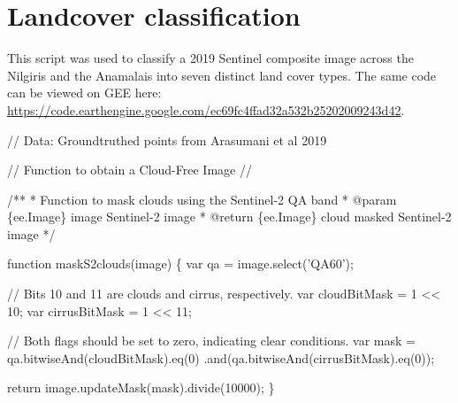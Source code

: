 \documentclass[]{article}
\newenvironment{Shaded}{}{}
\newcommand{\AnnotationTok}[1]{\textcolor[rgb]{0.00,0.50,0.00}{#1}}
\newcommand{\AttributeTok}[1]{#1}
\newcommand{\CommentTok}[1]{\textcolor[rgb]{0.00,0.50,0.00}{#1}}
\newcommand{\CommentVarTok}[1]{\textcolor[rgb]{0.00,0.50,0.00}{#1}}
\newcommand{\ControlFlowTok}[1]{\textcolor[rgb]{0.00,0.00,1.00}{#1}}
\newcommand{\DecValTok}[1]{#1}
\newcommand{\KeywordTok}[1]{\textcolor[rgb]{0.00,0.00,1.00}{#1}}
\newcommand{\NormalTok}[1]{#1}
\newcommand{\OperatorTok}[1]{#1}
\newcommand{\StringTok}[1]{\textcolor[rgb]{0.00,0.50,0.50}{#1}}
\newcommand{\VariableTok}[1]{#1}
\begin{document}
\hypertarget{landcover-classification}{%
\section{Landcover classification}\label{landcover-classification}}

This script was used to classify a 2019 Sentinel composite image across the Nilgiris and the Anamalais into seven distinct land cover types. The same code can be viewed on GEE here: \url{https://code.earthengine.google.com/ec69fc4ffad32a532b25202009243d42}.

\begin{Shaded}
\begin{Highlighting}[numbers=left,,]
\CommentTok{// Data: Groundtruthed points from Arasumani et al 2019}

\CommentTok{// Function to obtain a Cloud-Free Image // }

\CommentTok{/**}
\CommentTok{ * Function to mask clouds using the Sentinel-2 QA band}
\CommentTok{ * }\AnnotationTok{@param}\CommentTok{ }\CommentVarTok{\{ee.Image\}}\CommentTok{ image Sentinel-2 image}
\CommentTok{ * }\AnnotationTok{@return}\CommentTok{ \{ee.Image\} cloud masked Sentinel-2 image}
\CommentTok{ */}
 
\KeywordTok{function} \AttributeTok{maskS2clouds}\NormalTok{(image) }\OperatorTok{\{}
  \KeywordTok{var}\NormalTok{ qa }\OperatorTok{=} \VariableTok{image}\NormalTok{.}\AttributeTok{select}\NormalTok{(}\StringTok{'QA60'}\NormalTok{)}\OperatorTok{;}

  \CommentTok{// Bits 10 and 11 are clouds and cirrus, respectively.}
  \KeywordTok{var}\NormalTok{ cloudBitMask }\OperatorTok{=} \DecValTok{1} \OperatorTok{<<} \DecValTok{10}\OperatorTok{;}
  \KeywordTok{var}\NormalTok{ cirrusBitMask }\OperatorTok{=} \DecValTok{1} \OperatorTok{<<} \DecValTok{11}\OperatorTok{;}

  \CommentTok{// Both flags should be set to zero, indicating clear conditions.}
  \KeywordTok{var}\NormalTok{ mask }\OperatorTok{=} \VariableTok{qa}\NormalTok{.}\AttributeTok{bitwiseAnd}\NormalTok{(cloudBitMask).}\AttributeTok{eq}\NormalTok{(}\DecValTok{0}\NormalTok{)}
\NormalTok{      .}\AttributeTok{and}\NormalTok{(}\VariableTok{qa}\NormalTok{.}\AttributeTok{bitwiseAnd}\NormalTok{(cirrusBitMask).}\AttributeTok{eq}\NormalTok{(}\DecValTok{0}\NormalTok{))}\OperatorTok{;}

  \ControlFlowTok{return} \VariableTok{image}\NormalTok{.}\AttributeTok{updateMask}\NormalTok{(mask).}\AttributeTok{divide}\NormalTok{(}\DecValTok{10000}\NormalTok{)}\OperatorTok{;}
\OperatorTok{\}}


\end{Highlighting}
\end{Shaded}
\end{document}
